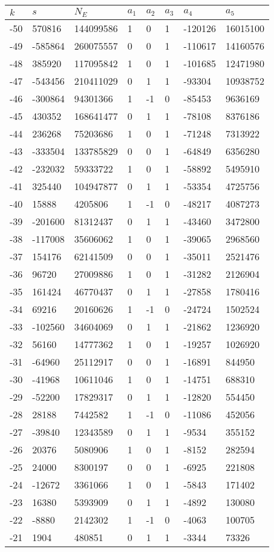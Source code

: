 \documentclass{amsart}
\begin{document}
\begin{longtable}{|l|l|l|lllll|}
\hline
$k$ & $s$ & $N_E$ & $a_1$ & $a_2$ & $a_3$ & $a_4$ & $a_5$\\
\hline
-50&570816&144099586&1&0&1&-120126&16015100\\
-49&-585864&260075557&0&0&1&-110617&14160576\\
-48&385920&117095842&1&0&1&-101685&12471980\\
-47&-543456&210411029&0&1&1&-93304&10938752\\
-46&-300864&94301366&1&-1&0&-85453&9636169\\
-45&430352&168641477&0&1&1&-78108&8376186\\
-44&236268&75203686&1&0&1&-71248&7313922\\
-43&-333504&133785829&0&0&1&-64849&6356280\\
-42&-232032&59333722&1&0&1&-58892&5495910\\
-41&325440&104947877&0&1&1&-53354&4725756\\
-40&15888&4205806&1&-1&0&-48217&4087273\\
-39&-201600&81312437&0&1&1&-43460&3472800\\
-38&-117008&35606062&1&0&1&-39065&2968560\\
-37&154176&62141509&0&0&1&-35011&2521476\\
-36&96720&27009886&1&0&1&-31282&2126904\\
-35&161424&46770437&0&1&1&-27858&1780416\\
-34&69216&20160626&1&-1&0&-24724&1502524\\
-33&-102560&34604069&0&1&1&-21862&1236920\\
-32&56160&14777362&1&0&1&-19257&1026920\\
-31&-64960&25112917&0&0&1&-16891&844950\\
-30&-41968&10611046&1&0&1&-14751&688310\\
-29&-52200&17829317&0&1&1&-12820&554450\\
-28&28188&7442582&1&-1&0&-11086&452056\\
-27&-39840&12343589&0&1&1&-9534&355152\\
-26&20376&5080906&1&0&1&-8152&282594\\
-25&24000&8300197&0&0&1&-6925&221808\\
-24&-12672&3361066&1&0&1&-5843&171402\\
-23&16380&5393909&0&1&1&-4892&130080\\
-22&-8880&2142302&1&-1&0&-4063&100705\\
-21&1904&480851&0&1&1&-3344&73326\\

\end{longtable}
\end{document}

